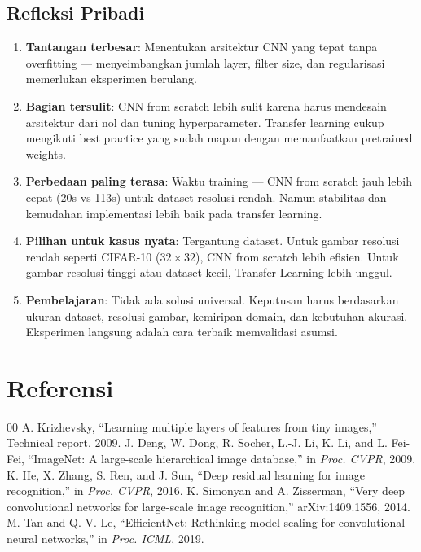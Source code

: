 \documentclass[conference]{IEEEtran}
\begin{document}
\subsection{Refleksi Pribadi}
\begin{enumerate}
\item \textbf{Tantangan terbesar}: Menentukan arsitektur CNN yang tepat tanpa overfitting — menyeimbangkan jumlah layer, filter size, dan regularisasi memerlukan eksperimen berulang.
\item \textbf{Bagian tersulit}: CNN from scratch lebih sulit karena harus mendesain arsitektur dari nol dan tuning hyperparameter. Transfer learning cukup mengikuti best practice yang sudah mapan dengan memanfaatkan pretrained weights.
\item \textbf{Perbedaan paling terasa}: Waktu training — CNN from scratch jauh lebih cepat (20s vs 113s) untuk dataset resolusi rendah. Namun stabilitas dan kemudahan implementasi lebih baik pada transfer learning.
\item \textbf{Pilihan untuk kasus nyata}: Tergantung dataset. Untuk gambar resolusi rendah seperti CIFAR-10 ($32\times32$), CNN from scratch lebih efisien. Untuk gambar resolusi tinggi atau dataset kecil, Transfer Learning lebih unggul.
\item \textbf{Pembelajaran}: Tidak ada solusi universal. Keputusan harus berdasarkan ukuran dataset, resolusi gambar, kemiripan domain, dan kebutuhan akurasi. Eksperimen langsung adalah cara terbaik memvalidasi asumsi.
\end{enumerate}

\section*{Referensi}
\begin{thebibliography}{00}
 A. Krizhevsky, ``Learning multiple layers of features from tiny images,'' Technical report, 2009.
 J. Deng, W. Dong, R. Socher, L.-J. Li, K. Li, and L. Fei-Fei, ``ImageNet: A large-scale hierarchical image database,'' in \textit{Proc. CVPR}, 2009.
 K. He, X. Zhang, S. Ren, and J. Sun, ``Deep residual learning for image recognition,'' in \textit{Proc. CVPR}, 2016.
 K. Simonyan and A. Zisserman, ``Very deep convolutional networks for large-scale image recognition,'' arXiv:1409.1556, 2014.
 M. Tan and Q. V. Le, ``EfficientNet: Rethinking model scaling for convolutional neural networks,'' in \textit{Proc. ICML}, 2019.
\end{thebibliography}
\vspace{12pt}
\end{document}
